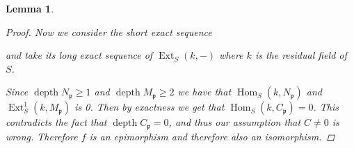 \documentclass[11pt, a4paper, english]{article}
\newtheorem{lemma}[theorem]{Lemma}
\theoremstyle{definition}
\DeclareMathOperator{\Hom}{Hom}
\DeclareMathOperator{\Ext}{Ext}
\DeclareMathOperator{\depth}{depth}
\begin{document}
\begin{lemma}
\begin{proof}
Now we consider the short exact sequence
\begin{center}
\end{center}
and take its long exact sequence of $\Ext_S(k, -)$ where $k$ is the residual field of $S$.
\begin{center}
\end{center}
Since $\depth N_\mathfrak{p} \geq 1$ and $\depth M_\mathfrak{p} \geq 2$ we have that $\Hom_S(k, N_\mathfrak{p})$ and $\Ext^1_S(k, M_\mathfrak{p})$ is 0. Then by exactness we get that $\Hom_S(k, C_\mathfrak{p}) = 0$. This contradicts the fact that $\depth C_\mathfrak{p} = 0$, and thus our assumption that $C \neq 0$ is wrong. Therefore $f$ is an epimorphism and therefore also an isomorphism.
\end{proof}
\end{lemma}
\end{document}
